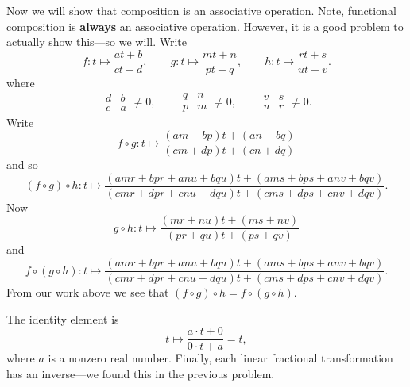 \documentclass{ximera}
\begin{document}
\begin{problem}
\begin{freeResponse}
Now we will show that composition is an associative operation. Note,
functional composition is \textbf{always} an associative
operation. However, it is a good problem to actually show this---so
we will. Write
\[
f:t \mapsto\frac{at+b}{ct+d},\qquad
g:t \mapsto\frac{mt+n}{pt+q},\qquad
h:t \mapsto\frac{rt+s}{ut+v}.
\]
where
\[
\begin{array}{|cc|}
d & b\\
c& a
\end{array} \ne 0,\qquad
\begin{array}{|cc|}
q & n\\
p& m
\end{array} \ne 0,\qquad
\begin{array}{|cc|}
v & s\\
u& r
\end{array} \ne 0.
\]
Write
\[
f\circ g : t \mapsto \frac{(am+bp)t+(an+bq)}{(cm+dp)t + (cn+dq)}
\]
and so
\[
(f\circ g) \circ h : t\mapsto \frac{(amr+bpr+anu+bqu)t+(ams+bps+anv+bqv)}{(cmr+dpr+cnu+dqu)t+(cms+dps+cnv+dqv)}. 
\]
Now
\[
g\circ h : t \mapsto \frac{(mr+nu)t+(ms+nv)}{(pr+qu)t + (ps+qv)}
\]
and
\[
f\circ (g \circ h) : t\mapsto \frac{(amr+bpr+anu+bqu)t+(ams+bps+anv+bqv)}{(cmr+dpr+cnu+dqu)t+(cms+dps+cnv+dqv)}. 
\]
From our work above we see that $(f\circ g)\circ h = f\circ(g\circ
 h)$.  

The identity element is
\[
t\mapsto \frac{a\cdot t + 0}{0\cdot t + a} = t,
\]
where $a$ is a nonzero real number.  Finally, each linear fractional
transformation has an inverse---we found this in the previous problem.
\end{freeResponse}
\end{problem}
\end{document}
